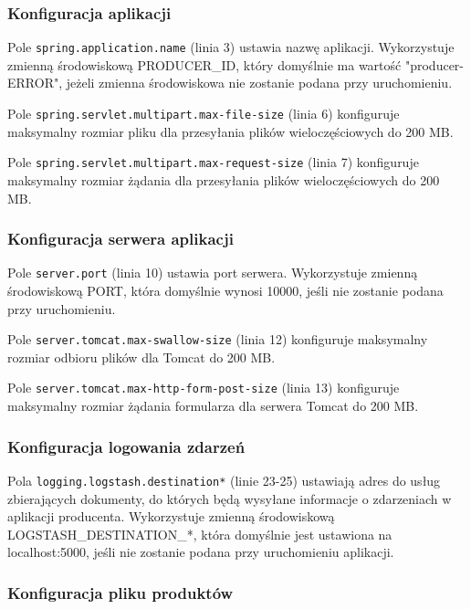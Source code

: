 \subsubsection{Konfiguracja aplikacji}

Pole \verb|spring.application.name| (linia 3) ustawia nazwę aplikacji. Wykorzystuje zmienną środowiskową PRODUCER\_ID, który domyślnie ma wartość "producer-ERROR", jeżeli zmienna środowiskowa nie zostanie podana przy uruchomieniu.

Pole \verb|spring.servlet.multipart.max-file-size| (linia 6) konfiguruje maksymalny rozmiar pliku dla przesyłania plików wieloczęściowych do 200 MB.

Pole \verb|spring.servlet.multipart.max-request-size| (linia 7) konfiguruje maksymalny rozmiar żądania dla przesyłania plików wieloczęściowych do 200 MB.

\subsubsection{Konfiguracja serwera aplikacji}

Pole \verb|server.port| (linia 10) ustawia port serwera. Wykorzystuje zmienną środowiskową PORT, która domyślnie wynosi 10000, jeśli nie zostanie podana przy uruchomieniu.

Pole \verb|server.tomcat.max-swallow-size| (linia 12) konfiguruje maksymalny rozmiar odbioru plików dla Tomcat do 200 MB.

Pole \verb|server.tomcat.max-http-form-post-size| (linia 13) konfiguruje maksymalny rozmiar żądania  formularza  dla serwera Tomcat do 200 MB.

\subsubsection{Konfiguracja logowania zdarzeń}

Pola \verb|logging.logstash.destination*| (linie 23-25) ustawiają adres do usług zbierających dokumenty, do których będą wysyłane informacje o zdarzeniach w aplikacji producenta. Wykorzystuje zmienną środowiskową LOGSTASH\_DESTINATION\_*, która domyślnie jest ustawiona na localhost:5000, jeśli nie zostanie podana przy uruchomieniu aplikacji.

\subsubsection{Konfiguracja pliku produktów}

